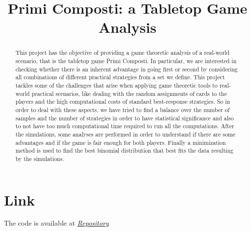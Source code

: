 \documentclass[conference]{IEEEtran}
\begin{document}
\title{Primi Composti: a Tabletop Game Analysis}

\author{
\and
{}
\and
{}
}
\maketitle

\begin{abstract}
	This project has the objective of providing a game theoretic analysis of a real-world scenario, that is the tabletop game Primi Composti. In particular, we are interested in checking whether there is an inherent advantage in going first or second by considering all combinations of different practical strategies from a set we define.
	This project tackles some of the challenges that arise when applying game theoretic tools to real-world practical scenarios, like dealing with the random assignments of cards to the players and the high computational costs of standard best-response strategies. So in order to deal with these aspects, we have tried to find a balance over the number of samples and the number of strategies in order to have statistical significance and also to not have too much computational time required to run all the computations.
    After the simulations, some analyses are performed in order to understand if there are some advantages and if the game is fair enough for both players.
    Finally a minimization method is used to find the best binomial distribution that best fits the data resulting by the simulations.
\end{abstract}






\section*{Link}
The code is available at \href{https://github.com/Sproc01/GT_PrimeComposite.git}{\textit{Repository}}
\end{document}
